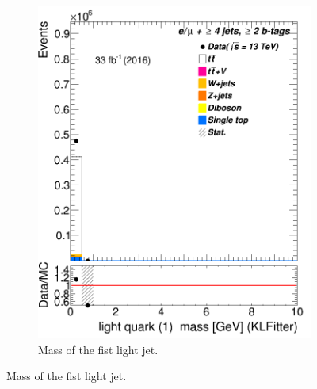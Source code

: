 \begin{figure}
\begin{subfigure}{0.35\textwidth}
		\includegraphics[width=\linewidth]{ControlPlots_emujets_2016_4incl_2incl/klf_lq1_m_emujets_2016.png}
		\caption{Mass of the fist light jet.} \label{fig:klf9}
	\end{subfigure}
	

\end{figure}
